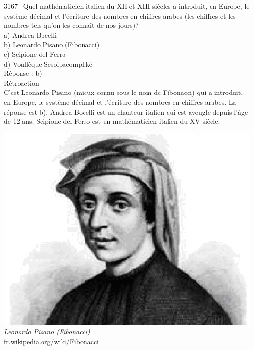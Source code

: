 \documentclass[letterpaper, 12pt]{article}
\begin{document}
3167-- Quel math\'ematicien italien du {\scriptsize XII\ieme} et {\scriptsize XIII\ieme{}} si\`ecles a introduit, en Europe, le syst\`eme d\'ecimal et l'\'ecriture des nombres en chiffres arabes (les chiffres et les nombres tels qu'on les conna\^it de nos jours)?\\

a) Andrea Bocelli\\
b) Leonardo Pisano (Fibonacci)\\
c) Scipione del Ferro\\
d) Voull\`eque Sesoipacomplik\'e\\

R\'eponse : b)\\

R\'etroaction :\\
C'est Leonardo Pisano (mieux connu sous le nom de Fibonacci) qui a introduit, en Europe, le syst\`eme d\'ecimal et l'\'ecriture des nombres en chiffres arabes. La r\'eponse est b). Andrea Bocelli est un chanteur italien qui est aveugle depuis l'\^age de 12 ans. Scipione del Ferro est un math\'ematicien italien du {\scriptsize XV\ieme} si\`ecle.
\begin{center}
\includegraphics[scale=0.4]{Fibonacci.eps}\\
\emph{{\small Leonardo Pisano (Fibonacci)}}\\
\href{http://fr.wikipedia.org/wiki/Fibonacci}{fr.wikipedia.org/wiki/Fibonacci}\\[5mm]
\end{center}
\end{document}
